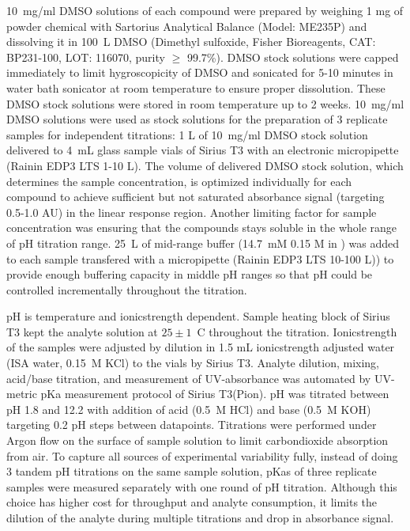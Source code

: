 \documentclass[9pt,lineno]{elife}
\begin{document}
10~mg/ml DMSO solutions of each compound were prepared by weighing 1 mg of powder chemical with Sartorius Analytical Balance (Model: ME235P) and dissolving it in 100~\micro L DMSO (Dimethyl sulfoxide, Fisher Bioreagents, CAT: BP231-100, LOT: 116070, purity $\geq$ 99.7\%).  DMSO stock solutions were capped immediately to limit hygroscopicity of DMSO and sonicated for 5-10 minutes in water bath sonicator at room temperature to ensure proper dissolution. These DMSO stock solutions were stored in room temperature up to 2 weeks. 10~mg/ml DMSO solutions were used as stock solutions for the preparation of 3 replicate samples for independent titrations:  1 \micro L of 10~mg/ml DMSO stock solution delivered to 4~mL glass sample vials of Sirius T3 with an electronic micropipette (Rainin EDP3 LTS 1-10 \micro L). The volume of delivered DMSO stock solution, which determines the sample concentration, is optimized individually for each compound to achieve sufficient but not saturated absorbance signal (targeting 0.5-1.0 AU) in the linear response region. Another limiting factor for sample concentration was ensuring that the compounds stays soluble in the whole range of pH titration range. 25~\micro L of mid-range buffer (14.7~mM  0.15 M  in ) was added to each sample transfered with a micropipette (Rainin EDP3 LTS 10-100 \micro L)) to provide enough buffering capacity in middle pH ranges so that pH could be controlled incrementally throughout the titration.  

pH is temperature and ionic\textendash strength dependent. Sample heating block of Sirius T3 kept the analyte solution at $25 \pm 1$~\textdegree C throughout the titration. Ionic\textendash strength of the samples were adjusted by dilution in 1.5 mL ionic\textendash strength adjusted water (ISA water, 0.15~M KCl) to the vials by Sirius T3.  Analyte dilution, mixing, acid/base titration, and measurement of UV-absorbance was automated by UV-metric pKa measurement protocol of Sirius T3(Pion). pH was titrated between pH 1.8 and 12.2 with addition of acid (0.5~M HCl) and base (0.5~M KOH) targeting 0.2 pH steps between datapoints. Titrations were performed under Argon flow on the surface of sample solution to limit carbondioxide absorption from air. To capture all sources of experimental variability fully, instead of doing 3 tandem pH titrations on the same sample solution, pKas of three replicate samples were measured separately with one round of pH titration. Although this choice has higher cost for throughput and analyte consumption, it limits the dilution of the analyte during multiple titrations and drop in absorbance signal. 
\end{document}
